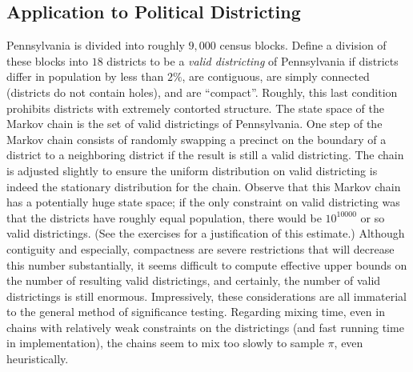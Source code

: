 \documentclass[12pt]{article}
\begin{document}
\subsection*{Application to Political Districting}

Pennsylvania is divided into roughly \( 9,000 \) census blocks.  Define
a division of these blocks into \( 18 \) districts to be a \emph{valid
districting} of Pennsylvania if districts differ in population by less
than \( 2\% \), are contiguous, are simply connected (districts do not
contain holes), and are ``compact''.  Roughly, this last condition
prohibits districts with extremely contorted structure.  The state space
of the Markov chain is the set of valid districtings of Pennsylvania.
One step of the Markov chain consists of randomly swapping a precinct on
the boundary of a district to a neighboring district if the result is
still a valid districting.  The chain is adjusted slightly to ensure the
uniform distribution on valid districting is indeed the stationary
distribution for the chain.  Observe that this Markov chain has a
potentially huge state space; if the only constraint on valid
districting was that the districts have roughly equal population, there
would be \( 10^{10000} \) or so valid districtings.  (See the exercises
for a justification of this estimate.) Although contiguity and
especially, compactness are severe restrictions that will decrease this
number substantially, it seems difficult to compute effective upper
bounds on the number of resulting valid districtings, and certainly, the
number of valid districtings is still enormous.  Impressively, these
considerations are all immaterial to the general method of significance
testing.  Regarding mixing time, even in chains with relatively weak
constraints on the districtings (and fast running time in implementation),
the chains seem to mix too slowly to sample \( \pi \), even
heuristically.
\end{document}
